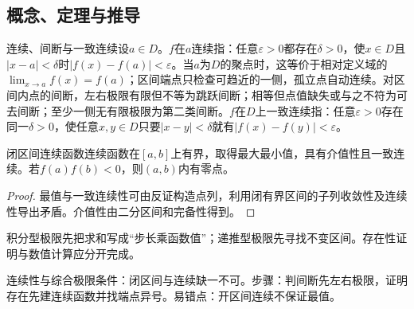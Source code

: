 \subsection{概念、定理与推导}

\begin{definition}{连续、间断与一致连续}设$a\in D$。$f$在$a$连续指：任意$\varepsilon>0$都存在$\delta>0$，使$x\in D$且$|x-a|<\delta$时$|f(x)-f(a)|<\varepsilon$。当$a$为$D$的聚点时，这等价于相对定义域的$\lim_{x\to a}f(x)=f(a)$；区间端点只检查可趋近的一侧，孤立点自动连续。对区间内点的间断，左右极限有限但不等为跳跃间断；相等但点值缺失或与之不符为可去间断；至少一侧无有限极限为第二类间断。$f$在$D$上一致连续指：任意$\varepsilon>0$存在同一$\delta>0$，使任意$x,y\in D$只要$|x-y|<\delta$就有$|f(x)-f(y)|<\varepsilon$。\end{definition}
\begin{theorem}{闭区间连续函数}连续函数在$[a,b]$上有界，取得最大最小值，具有介值性且一致连续。若$f(a)f(b)<0$，则$(a,b)$内有零点。\end{theorem}
\begin{proof}最值与一致连续性可由反证构造点列，利用闭有界区间的子列收敛性及连续性导出矛盾。介值性由二分区间和完备性得到。\end{proof}
\begin{extension}积分型极限先把求和写成“步长乘函数值”；递推型极限先寻找不变区间。存在性证明与数值计算应分开完成。\end{extension}

\begin{method}{连续性与综合极限}条件：闭区间与连续缺一不可。步骤：判间断先左右极限，证明存在先建连续函数并找端点异号。易错点：开区间连续不保证最值。\end{method}

